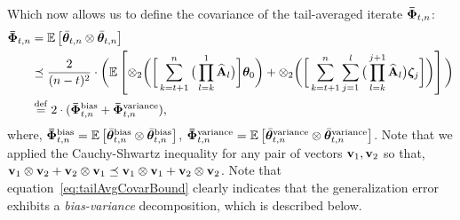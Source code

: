 Which now allows us to define the covariance of the tail-averaged iterate $\boldsymbol{\bar{\Phi}}_{t,n}$:
\begin{align}
\label{eq:tailAvgCovarBound}
\boldsymbol{\bar{\Phi}}_{t,n}&=\mathbb{E}\left[{\bar{\boldsymbol{\theta}}}_{t,n}\otimes{\bar{\boldsymbol{\theta}}}_{t,n}\right]\nonumber\\
&\preceq\frac{2}{(n-t)^2}\cdot\bigg(\mathbb{E}\left[ \otimes_2\bigg( \bigg[\sum_{k=t+1}^n\big(\prod_{l=k}^1\widehat{\mathbf{A}}_l\big)\bigg]\boldsymbol{\theta}_0\bigg) + \otimes_2\bigg(\bigg[\sum_{k=t+1}^n\sum_{j=1}^l\big(\prod_{l=k}^{j+1}\widehat{\mathbf{A}}_l\big)\boldsymbol{\zeta}_j\bigg]\bigg)\right] \bigg)\nonumber\\
&\stackrel{\mathrm{def}}{=} 2\cdot(\boldsymbol{\bar{\Phi}}_{t,n}^{\text{bias}} + \boldsymbol{\bar{\Phi}}_{t,n}^{\text{variance}}),
\end{align}
where, $\boldsymbol{\bar{\Phi}}_{t,n}^{\text{bias}}=\mathbb{E}\left[{\bar{\boldsymbol{\theta}}}_{t,n}^{\textrm{bias}}\otimes{\bar{\boldsymbol{\theta}}}_{t,n}^{\textrm{bias}}\right]$, $\boldsymbol{\bar{\Phi}}_{t,n}^{\text{variance}}=\mathbb{E}\left[{\bar{\boldsymbol{\theta}}}_{t,n}^{\textrm{variance}}\otimes{\bar{\boldsymbol{\theta}}}_{t,n}^{\textrm{variance}}\right]$.
Note that we applied the Cauchy-Shwartz inequality for any pair of vectors $\mathbf{v}_1,\mathbf{v}_2$ so that, $\mathbf{v}_1\otimes\mathbf{v}_2+\mathbf{v}_2\otimes\mathbf{v}_1\preceq\mathbf{v}_1\otimes\mathbf{v}_1+\mathbf{v}_2\otimes\mathbf{v}_2$.  Note that equation~\ref{eq:tailAvgCovarBound} clearly indicates that the generalization error exhibits a {\em bias-variance} decomposition, which is described below.

